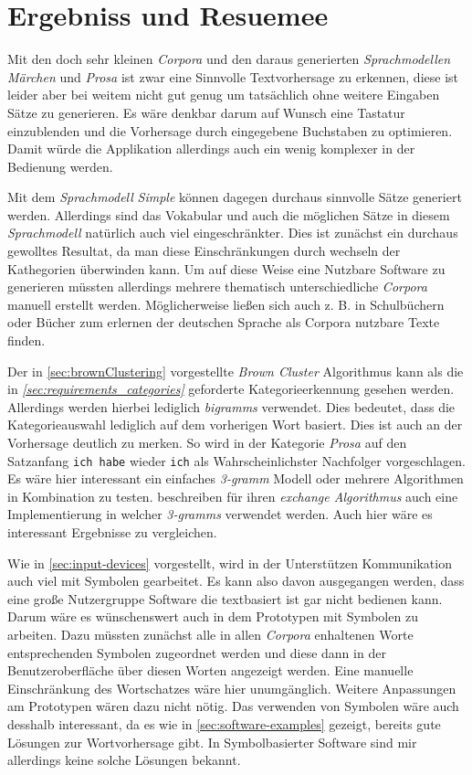 \section{Ergebniss und Resuemee}
    
    Mit den doch sehr kleinen \emph{Corpora} und den daraus generierten \emph{Sprachmodellen} \emph{Märchen} und \emph{Prosa} ist zwar eine Sinnvolle Textvorhersage zu erkennen, diese ist leider aber bei weitem nicht gut genug um tatsächlich ohne weitere Eingaben Sätze zu generieren. Es wäre denkbar darum auf Wunsch eine Tastatur einzublenden und die Vorhersage durch eingegebene Buchstaben zu optimieren. Damit würde die Applikation allerdings auch ein wenig komplexer in der Bedienung werden. 
    
    Mit dem \emph{Sprachmodell} \emph{Simple} können dagegen durchaus sinnvolle Sätze generiert werden. Allerdings sind das Vokabular und auch die möglichen Sätze in diesem \emph{Sprachmodell} natürlich auch viel eingeschränkter. Dies ist zunächst ein durchaus gewolltes Resultat, da man diese Einschränkungen durch wechseln der Kathegorien überwinden kann. Um auf diese Weise eine Nutzbare Software zu generieren müssten allerdings mehrere thematisch unterschiedliche \emph{Corpora} manuell erstellt werden. Möglicherweise ließen sich auch z. B. in Schulbüchern oder Bücher zum erlernen der deutschen Sprache als Corpora nutzbare Texte finden.
    
	Der in \autoref{sec:brownClustering} vorgestellte \emph{Brown Cluster} Algorithmus kann als die in \emph{\autoref{sec:requirements_categories}} geforderte Kategorieerkennung gesehen werden. Allerdings werden hierbei lediglich \emph{bigramms} verwendet. Dies bedeutet, dass die Kategorieauswahl lediglich auf dem vorherigen Wort basiert. Dies ist auch an der Vorhersage deutlich zu merken. So wird in der Kategorie \emph{Prosa} auf den Satzanfang \texttt{ich habe} wieder \texttt{ich} als Wahrscheinlichster Nachfolger vorgeschlagen. Es wäre hier interessant ein einfaches \emph{3-gramm} Modell oder mehrere Algorithmen in Kombination zu testen. \cite{speechcommunication:exchange} beschreiben für ihren \emph{exchange Algorithmus} auch eine Implementierung in welcher \emph{3-gramms} verwendet werden. Auch hier wäre es interessant Ergebnisse zu vergleichen.
            
    Wie in \autoref{sec:input-devices} vorgestellt, wird in der Unterstützen Kommunikation auch viel mit Symbolen gearbeitet. Es kann also davon ausgegangen werden, dass eine große Nutzergruppe Software die textbasiert ist gar nicht bedienen kann. Darum wäre es wünschenswert auch in dem Prototypen mit Symbolen zu arbeiten. Dazu müssten zunächst alle in allen \emph{Corpora} enhaltenen Worte entsprechenden Symbolen zugeordnet werden und diese dann in der Benutzeroberfläche über diesen Worten angezeigt werden. Eine manuelle Einschränkung des Wortschatzes wäre hier unumgänglich. Weitere Anpassungen am Prototypen wären dazu nicht nötig. Das verwenden von Symbolen wäre auch desshalb interessant, da es wie in \autoref{sec:software-examples} gezeigt, bereits gute Lösungen zur Wortvorhersage gibt. In Symbolbasierter Software sind mir allerdings keine solche Lösungen bekannt.
        
